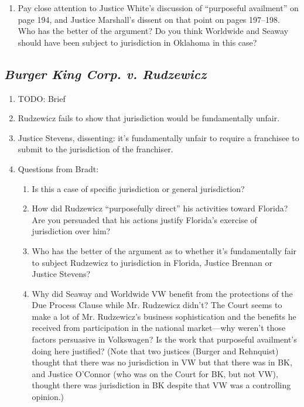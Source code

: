\begin{enumerate}
\begin{enumerate}
        \item Pay close attention to Justice White's discussion of ``purposeful availment'' on page 194, and Justice Marshall's dissent on that point on pages 197--198. Who has the better of the argument?  Do you think Worldwide and Seaway should have been subject to jurisdiction in Oklahoma in this case?
    \end{enumerate}

\end{enumerate}

\subsection{\emph{Burger King Corp. v. Rudzewicz}}

\begin{enumerate}
    \item TODO: Brief
    \item Rudzewicz fails to show that jurisdiction would be fundamentally unfair.
    \item Justice Stevens, dissenting: it's fundamentally unfair to require a franchisee to submit to the jurisdiction of the franchiser.
    \item Questions from Bradt:
    \begin{enumerate}
        \item Is this a case of specific jurisdiction or general jurisdiction?
        \item How did Rudzewicz ``purposefully direct'' his activities toward Florida? Are you persuaded that his actions justify Florida's exercise of jurisdiction over him?
        \item Who has the better of the argument as to whether it's fundamentally fair to subject Rudzewicz to jurisdiction in Florida, Justice Brennan or Justice Stevens?
        \item Why did Seaway and Worldwide VW benefit from the protections of the Due Process Clause while Mr. Rudzewicz didn't? The Court seems to make a lot of Mr. Rudzewicz's business sophistication and the benefits he received from participation in the national market---why weren't those factors persuasive in Volkswagen? Is the work that purposeful availment's doing here justified? (Note that two justices (Burger and Rehnquist) thought that there was no jurisdiction in VW but that there was in BK, and Justice O'Connor (who was on the Court for BK, but not VW), thought there was jurisdiction in BK despite that VW was a controlling opinion.)
    \end{enumerate}
\end{enumerate}

